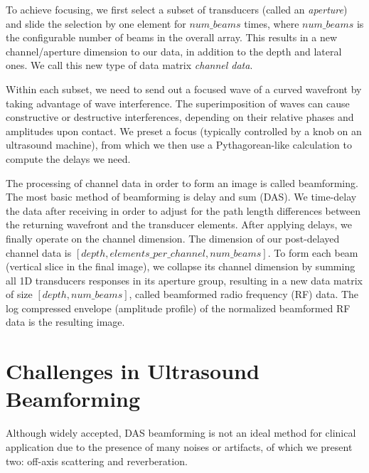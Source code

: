  To achieve focusing, we first select a subset of transducers (called an \textit{aperture}) and slide the selection by one element for $num\_beams$ times, where $num\_beams$ is the configurable number of beams in the overall array. This results in a new channel/aperture dimension to our data, in addition to the depth and lateral ones. We call this new type of data matrix \textit{channel data}. %

 Within each subset, we need to send out a focused wave of a curved wavefront by taking advantage of wave interference. The superimposition of waves can cause constructive or destructive interferences, depending on their relative phases and amplitudes upon contact. We preset a focus (typically controlled by a knob on an ultrasound machine), from which we then use a Pythagorean-like calculation to compute the delays we need.%

 The processing of channel data in order to form an image is called beamforming. The most basic method of beamforming is delay and sum (DAS). We time-delay the data after receiving in order to adjust for the path length differences between the returning wavefront and the transducer elements. After applying delays, we finally operate on the channel dimension. The dimension of our post-delayed channel data is $[depth, elements\_per\_channel, num\_beams]$. To form each beam (vertical slice in the final image), we collapse its channel dimension by summing all 1D transducers responses in its aperture group, resulting in a new data matrix of size $[depth, num\_beams]$, called beamformed radio frequency (RF) data. The log compressed envelope (amplitude profile) of the normalized beamformed RF data is the resulting image.


\section{Challenges in Ultrasound Beamforming}

Although widely accepted, DAS beamforming is not an ideal method for clinical application due to the presence of many noises or artifacts, of which we present two: off-axis scattering and reverberation.

